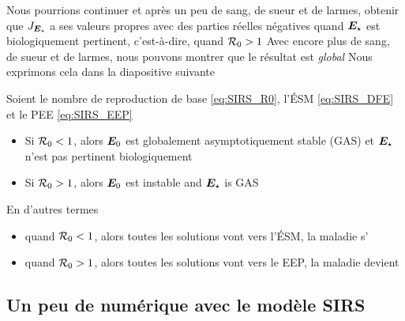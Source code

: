\documentclass[aspectratio=169]{beamer}\usepackage[]{graphicx}\usepackage[]{xcolor}
\begin{document}
\begin{frame}
Nous pourrions continuer et après un peu de sang, de sueur et de larmes, obtenir que $J_{\bm{E}_\star}$ a ses valeurs propres avec des parties réelles négatives quand $\bm{E}_\star$ est biologiquement pertinent, c'est-à-dire, quand $\mathcal{R}_0>1$
\vfill
Avec encore plus de sang, de sueur et de larmes, nous pouvons montrer que le résultat est \emph{global}
\vfill 
Nous exprimons cela dans la diapositive suivante
\end{frame}

\begin{frame}
\begin{theorem}\label{th:SIRS_GAS_behaviour}
Soient le nombre de reproduction de base \eqref{eq:SIRS_R0}, l'ÉSM \eqref{eq:SIRS_DFE} et le PEE \eqref{eq:SIRS_EEP}
\vskip1cm
\begin{itemize}
\item Si $\mathcal{R}_0<1$, alors $\bm{E}_0$ est globalement asymptotiquement stable (GAS) et $\bm{E}_\star$ n'est pas pertinent biologiquement
\item Si $\mathcal{R}_0>1$, alors $\bm{E}_0$ est instable and $\bm{E}_\star$ is GAS
\end{itemize}
\end{theorem}
\vfill
En d'autres termes
\begin{itemize}
\item quand $\mathcal{R}_0<1$, alors toutes les solutions vont vers l'ÉSM, la maladie s'
\item quand $\mathcal{R}_0>1$, alors toutes les solutions vont vers le EEP, la maladie devient 
\end{itemize}
\end{frame}

\subsection{Un peu de numérique avec le modèle SIRS}
\end{document}
